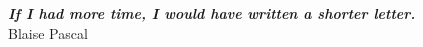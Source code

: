 \thispagestyle{empty}
\hbox{} \vfill
\begin{flushright}
    \small \textit{\textbf{If I had more time, I would have written a shorter letter.}}
    \\ \vspace{2mm}
    \scriptsize Blaise Pascal
\end{flushright}

\clearpage
\thispagestyle{empty}
\cleardoublepage